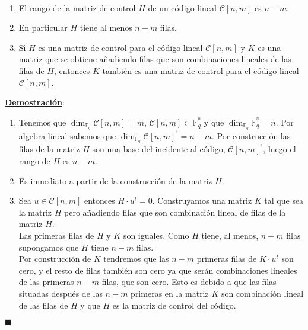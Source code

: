 \begin{proposicion}
\ \\
\begin{enumerate}
\item El rango de la matriz de control $H$ de un c\'odigo lineal
$\mathcal{C}[n,m]$ es $n-m$.
\item En particular $H$ tiene al menos $n-m$ filas.
\item S\'{\i} $H$ es una matriz de control para el c\'odigo lineal 
$\mathcal{C}[n,m]$ y $K$ es una matriz que se obtiene a\~nadiendo filas que son
combinaciones lineales de las filas de $H$, entonces $K$ tambi\'en es una matriz
de control para el c\'odigo lineal $\mathcal{C}[n,m]$.
\end{enumerate}
\end{proposicion}
\underline{\textbf{Demostraci\'on}}:\\
\begin{enumerate}
\item Tenemos que $\dim_{\mathbb{F}_q} \mathcal{C}[n,m] = m$,
$\mathcal{C}[n,m]\subset \mathbb{F}^{^n}_q$ y que $\dim_{\mathbb{F}_q}
\mathbb{F}^{^n}_q = n$. Por algebra lineal sabemos que
$\dim_{\mathbb{F}_q} \mathcal{C}[n,m]^{^{\circ}}=n-m$. Por construcci\'on las
filas de la matriz $H$ son una base del incidente al c\'odigo,
$\mathcal{C}[n,m]^{^{\circ}}$, luego el rango de $H$ es $n-m$.
\item Es inmediato a partir de la construcci\'on de la matriz $H$.
\item Sea $u\in \mathcal{C}[n,m]$ entonces $H\cdot u^t=0$. Construyamos una
matriz $K$ tal que sea la matriz $H$ pero a\~nadiendo filas que son
combinaci\'on lineal de filas de la matriz $H$.\\

Las primeras filas de $H$ y $K$ son iguales. Como $H$ tiene, al menos, $n-m$
filas supongamos que $H$ tiene $n-m$ filas.\\

Por construcci\'on de $K$ tendremos que las $n-m$ primeras filas de $K\cdot u^t$
son cero, y el resto de filas tambi\'en son cero ya que ser\'an combinaciones
lineales de las primeras $n-m$ filas, que son cero. Esto es debido a que las
filas situadas despu\'es de las $n-m$ primeras en la matriz $K$ son
combinaci\'on lineal de las filas de $H$ y que $H$ es la matriz de control del
c\'odigo.
\end{enumerate}
\begin{flushright}
$\blacksquare$
\end{flushright}
